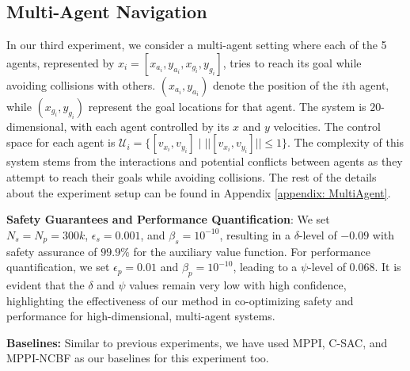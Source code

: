 \subsection{Multi-Agent Navigation}
In our third experiment, we consider a multi-agent setting where each of the 5 agents, represented by $x_i = [x_{a_i}, y_{a_i}, x_{g_i}, y_{g_i}]$, tries to reach its goal while avoiding collisions with others. $(x_{a_i}, y_{a_i})$ denote the position of the $i$th agent, while $(x_{g_i}, y_{g_i})$ represent the goal locations for that agent. The system is $20$-dimensional, with each agent controlled by its $x$ and $y$ velocities. The control space for each agent is $\mathcal{U}_i = \{[v_{x_i}, v_{y_i}] \mid ||[v_{x_i}, v_{y_i}]|| \leq 1\}$. 
The complexity of this system stems from the interactions and potential conflicts between agents as they attempt to reach their goals while avoiding collisions. The rest of the details about the experiment setup can be found in Appendix \ref{appendix: MultiAgent}.
% 

\textbf{Safety Guarantees and Performance Quantification}: We set $N_s = N_p = 300k$, $\epsilon_s = 0.001$, and $\beta_s = 10^{-10}$, resulting in a $\delta$-level of $-0.09$ with safety assurance of $99.9\%$ for the auxiliary value function. 
For performance quantification, we set $\epsilon_p = 0.01$ and $\beta_p = 10^{-10}$, leading to a $\psi$-level of 0.068.
It is evident that the $\delta$ and $\psi$ values remain very low with high confidence, highlighting the effectiveness of our method in co-optimizing safety and performance for high-dimensional, multi-agent systems.


\textbf{Baselines:} Similar to previous experiments, we have used MPPI, C-SAC, and MPPI-NCBF as our baselines for this experiment too.

